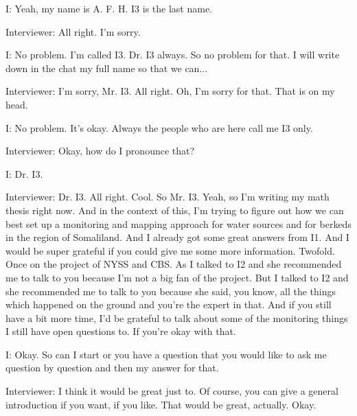 I: Yeah, my name is A. F. H. I3 is the last name. 

Interviewer:  All right. I'm sorry. 

I: No problem. I'm called I3. Dr. I3 always. So no problem for that. I will write down in the chat my full name so that we can... 

Interviewer:   I'm sorry, Mr. I3. All right. Oh, I'm sorry for that. That is on my head. 

I: No problem. It's okay. Always the people who are here call me I3 only. 

Interviewer:  Okay, how do I pronounce that? 

I: Dr. I3. 

Interviewer:  Dr. I3. All right. Cool. So Mr. I3. Yeah, so I'm writing my math thesis right now. And in the context of this, I'm trying to figure out how we can best set up a monitoring and mapping approach for water sources and for berkeds in the region of Somaliland. And I already got some great answers from I1. And I would be super grateful if you could give me some more information. Twofold. Once on the project of NYSS and CBS. As I talked to I2 and she recommended me to talk to you because I'm not a big fan of the project. But I talked to I2 and she recommended me to talk to you because she said, you know, all the things which happened on the ground and you're the expert in that. And if you still have a bit more time, I'd be grateful to talk about some of the monitoring things I still have open questions to. If you're okay with that.

I: Okay. So can I start or you have a question that you would like to ask me question by question and then my answer for that. 

Interviewer:  I think it would be great just to. Of course, you can give a general introduction if you want, if you like. That would be great, actually. Okay. 

